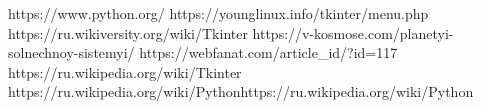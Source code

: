 \documentclass[11pt,a4paper]{report}
\begin{document}
\begin{thebibliography}{5}
https://www.python.org/
https://younglinux.info/tkinter/menu.php
https://ru.wikiversity.org/wiki/Tkinter
https://v-kosmose.com/planetyi-solnechnoy-sistemyi/
https://webfanat.com/article\_id/?id=117
https://ru.wikipedia.org/wiki/Tkinter
https://ru.wikipedia.org/wiki/Pythonhttps://ru.wikipedia.org/wiki/Python
\end{thebibliography}
\end{document}
